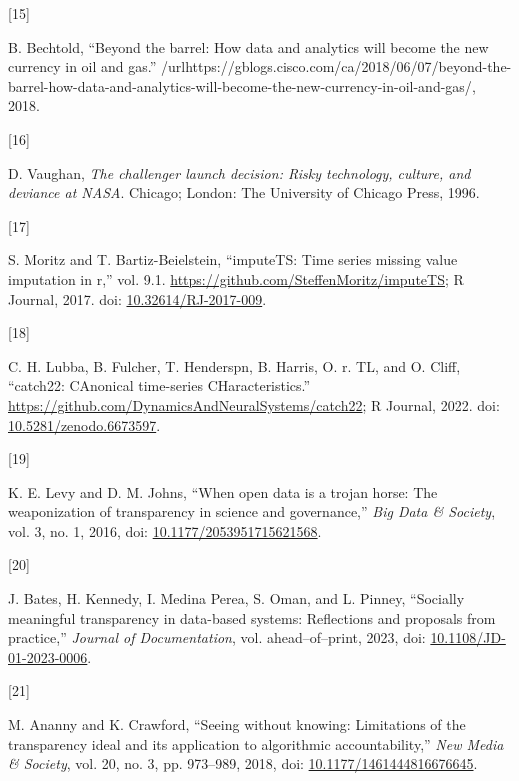 \documentclass{article}
\newlength{\cslhangindent}
\newlength{\csllabelwidth}
\newlength{\cslentryspacingunit} %
\newenvironment{CSLReferences}[2] %
 {%
  \setlength{\parindent}{0pt}
  \ifodd #1
  \let\oldpar\par
  \def\par{\hangindent=\cslhangindent\oldpar}
  \fi
  \setlength{\parskip}{#2\cslentryspacingunit}
 }%
 {}
\newcommand{\CSLLeftMargin}[1]{\parbox[t]{\csllabelwidth}{#1}}
\newcommand{\CSLRightInline}[1]{\parbox[t]{\linewidth - \csllabelwidth}{#1}\break}
\begin{document}
\begin{CSLReferences}{0}{0}
\leavevmode{}%
\CSLLeftMargin{{[}15{]} }
\CSLRightInline{B. Bechtold, {``Beyond the barrel: How data and
analytics will become the new currency in oil and gas.''}
/url{https://gblogs.cisco.com/ca/2018/06/07/beyond-the-barrel-how-data-and-analytics-will-become-the-new-currency-in-oil-and-gas/},
2018.}

\leavevmode{}%
\CSLLeftMargin{{[}16{]} }
\CSLRightInline{D. Vaughan, \emph{The challenger launch decision: Risky
technology, culture, and deviance at NASA}. Chicago; London: The
University of Chicago Press, 1996.}

\leavevmode{}%
\CSLLeftMargin{{[}17{]} }
\CSLRightInline{S. Moritz and T. Bartiz-Beielstein, {``imputeTS: Time
series missing value imputation in r,''} vol. 9.1.
\url{https://github.com/SteffenMoritz/imputeTS}; R Journal, 2017. doi:
\href{https://doi.org/10.32614/RJ-2017-009}{10.32614/RJ-2017-009}.}

\leavevmode{}%
\CSLLeftMargin{{[}18{]} }
\CSLRightInline{C. H. Lubba, B. Fulcher, T. Henderspn, B. Harris, O. r.
TL, and O. Cliff, {``catch22: CAnonical time-series CHaracteristics.''}
\url{https://github.com/DynamicsAndNeuralSystems/catch22}; R Journal,
2022. doi:
\href{https://doi.org/10.5281/zenodo.6673597}{10.5281/zenodo.6673597}.}

\leavevmode{}%
\CSLLeftMargin{{[}19{]} }
\CSLRightInline{K. E. Levy and D. M. Johns, {``When open data is a
trojan horse: The weaponization of transparency in science and
governance,''} \emph{Big Data \& Society}, vol. 3, no. 1, 2016, doi:
\href{https://doi.org/10.1177/2053951715621568}{10.1177/2053951715621568}.}

\leavevmode{}%
\CSLLeftMargin{{[}20{]} }
\CSLRightInline{J. Bates, H. Kennedy, I. Medina Perea, S. Oman, and L.
Pinney, {``Socially meaningful transparency in data-based systems:
Reflections and proposals from practice,''} \emph{Journal of
Documentation}, vol. ahead--of--print, 2023, doi:
\href{https://doi.org/10.1108/JD-01-2023-0006}{10.1108/JD-01-2023-0006}.}

\leavevmode{}%
\CSLLeftMargin{{[}21{]} }
\CSLRightInline{M. Ananny and K. Crawford, {``Seeing without knowing:
Limitations of the transparency ideal and its application to algorithmic
accountability,''} \emph{New Media \& Society}, vol. 20, no. 3, pp.
973--989, 2018, doi:
\href{https://doi.org/10.1177/1461444816676645}{10.1177/1461444816676645}.}


\end{CSLReferences}
\end{document}
